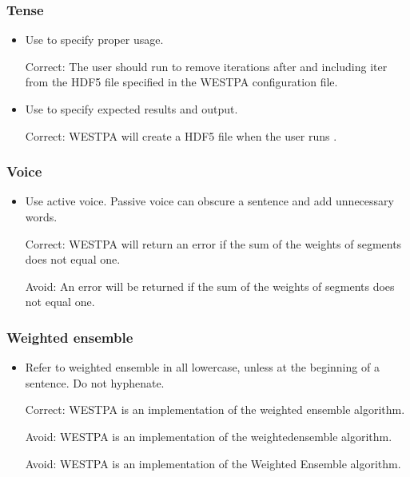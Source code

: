 \documentclass[letterpaper,10pt,english]{sphinxmanual}
\begin{document}
\subsubsection{Tense}
\label{\detokenize{development/style_guide:tense}}\begin{itemize}
\item {} 
Use  to specify proper usage.

Correct: The user should run  to remove
iterations after and including iter from the HDF5 file specified in the
WESTPA configuration file.

\item {} 
Use  to specify expected results and output.

Correct: WESTPA will create a HDF5 file when the user runs .

\end{itemize}


\subsubsection{Voice}
\label{\detokenize{development/style_guide:voice}}\begin{itemize}
\item {} 
Use active voice. Passive voice can obscure a sentence and add unnecessary
words.

Correct: WESTPA will return an error if the sum of the weights of segments
does not equal one.

Avoid: An error will be returned if the sum of the weights of segments does
not equal one.

\end{itemize}


\subsubsection{Weighted ensemble}
\label{\detokenize{development/style_guide:weighted-ensemble}}\begin{itemize}
\item {} 
Refer to weighted ensemble in all lowercase, unless at the beginning of a
sentence. Do not hyphenate.

Correct: WESTPA is an implementation of the weighted ensemble algorithm.

Avoid: WESTPA is an implementation of the weighted\sphinxhyphen{}ensemble algorithm.

Avoid: WESTPA is an implementation of the Weighted Ensemble algorithm.

\end{itemize}
\end{document}

